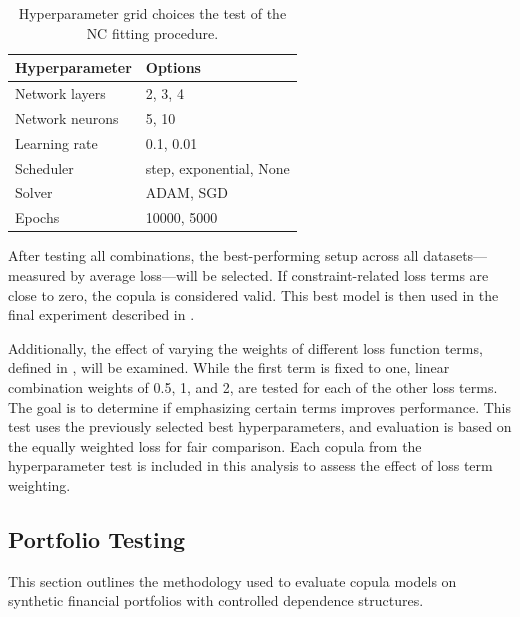 \begin{table}[h!]
    \centering
    \caption{Hyperparameter grid choices the test of the \gls{NC} fitting procedure.}
    \begin{tabular}{ll}
    \textbf{Hyperparameter} & \textbf{Options} \\
    \hline
    Network layers & 2, 3, 4 \\
    Network neurons & 5, 10 \\
    Learning rate & 0.1, 0.01 \\
    Scheduler & step, exponential, None \\
    Solver & ADAM, SGD \\
    Epochs & 10000, 5000 \\
    \end{tabular}
    \label{tab:se_hyperparams}
\end{table}


After testing all combinations, the best-performing setup across all datasets—measured by average loss—will be selected. If constraint-related loss terms are close to zero, the copula is considered valid. This best model is then used in the final experiment described in .

Additionally, the effect of varying the weights of different loss function terms, defined in , will be examined. While the first term is fixed to one, linear combination weights of 0.5, 1, and 2, are tested for each of the other loss terms. The goal is to determine if emphasizing certain terms improves performance. This test uses the previously selected best hyperparameters, and evaluation is based on the equally weighted loss for fair comparison. Each copula from the hyperparameter test is included in this analysis to assess the effect of loss term weighting.


\subsection{Portfolio Testing}\label{sec:PortfolioTesting}
This section outlines the methodology used to evaluate copula models on synthetic financial portfolios with controlled dependence structures.

